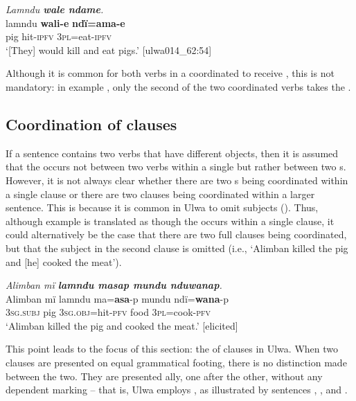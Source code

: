\ea%
    \label{ex:complex:22}
          \textit{Lamndu \textbf{wale ndame}.}\\
\gll lamndu  \textbf{wali-e}    \textbf{ndï=ama-e}\\
    pig      hit-\textsc{ipfv}  3\textsc{pl}=eat-\textsc{ipfv}\\
\glt `[They] would kill and eat pigs.’ [ulwa014\_62:54]
\z

Although it is common for both verbs in a coordinated  to receive , this is not mandatory: in example , only the second of the two coordinated verbs takes the .

\subsection{Coordination of clauses}\label{sec:12.1.2}


If a sentence contains two verbs that have different objects, then it is assumed that the  occurs not between two verbs within a single  but rather between two s. However, it is not always clear whether there are two s being coordinated within a single clause or there are two clauses being coordinated within a larger sentence. This is because it is common in Ulwa to omit subjects (). Thus, although example  is translated as though the  occurs within a single clause, it could alternatively be the case that there are two full clauses being coordinated, but that the subject in the second clause is omitted (i.e., ‘Alimban killed the pig and [he] cooked the meat’).

\ea%
    \label{ex:complex:23}
          \textit{Alimban mï \textbf{lamndu masap mundu nduwanap}.}\\
\gll Alimban  mï      lamndu  ma=\textbf{asa}-p      mundu   ndï=\textbf{wana}-p\\
    [name]    3\textsc{sg.subj}  pig      3\textsc{sg.obj}=hit-\textsc{pfv}  food    3\textsc{pl}=cook-\textsc{pfv}\\
\glt `Alimban killed the pig and cooked the meat.’ [elicited]
\z

This point leads to the focus of this section: the  of clauses in Ulwa. When two clauses are presented on equal grammatical footing, there is no distinction made between the two. They are presented ally, one after the other, without any  dependent marking -- that is, Ulwa employs , as illustrated by sentences , , and .

